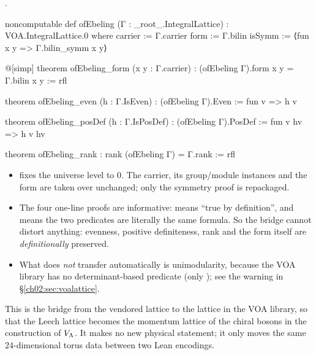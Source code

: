 \begin{definition}\label{ch02:def:ofEbeling}
.
\end{definition}
\begin{leancode}
noncomputable def ofEbeling (Γ : _root_.IntegralLattice) : VOA.IntegralLattice.{0} where
  carrier := Γ.carrier
  form := Γ.bilin
  isSymm := ⟨fun x y => Γ.bilin_symm x y⟩

@[simp] theorem ofEbeling_form (x y : Γ.carrier) : (ofEbeling Γ).form x y = Γ.bilin x y := rfl

theorem ofEbeling_even (h : Γ.IsEven) : (ofEbeling Γ).Even := fun v => h v

theorem ofEbeling_posDef (h : Γ.IsPosDef) : (ofEbeling Γ).PosDef := fun v hv => h v hv

theorem ofEbeling_rank : rank (ofEbeling Γ) = Γ.rank := rfl
\end{leancode}
\begin{dictionary}
\begin{itemize}
\item {} fixes the universe level to $0$.  The carrier, its group/module instances and
  the form are taken over unchanged; only the symmetry proof is repackaged.
\item The four one-line proofs are informative:  means ``true by definition'', and
   means the two predicates are literally the same formula.  So the bridge
  cannot distort anything: evenness, positive definiteness, rank and the form itself are
  \emph{definitionally} preserved.
\item What does \emph{not} transfer automatically is unimodularity, because the VOA library has
  no determinant-based predicate (only ); see the warning in
  \S\ref{ch02:sec:voalattice}.
\end{itemize}
\end{dictionary}
\begin{physics}
This is the bridge from the vendored lattice to the lattice in the VOA library, so that the Leech lattice becomes the momentum lattice of the chiral bosons in the construction of $V_{\Lambda}$. It makes no new physical statement; it only moves the same $24$-dimensional torus data between two Lean encodings.
\end{physics}

